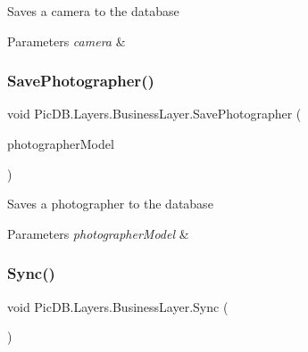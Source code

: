 Saves a camera to the database 


\begin{DoxyParams}{Parameters}
{\em camera} & \\
\hline
\end{DoxyParams}
\mbox{\label{class_pic_d_b_1_1_layers_1_1_business_layer_a7e60f5c2e5cd6f328a29d463fe55c39f}} 
\subsubsection{\texorpdfstring{Save\+Photographer()}{SavePhotographer()}}
{\footnotesize\ttfamily void Pic\+D\+B.\+Layers.\+Business\+Layer.\+Save\+Photographer (\begin{DoxyParamCaption}\item[{\mbox{\hyperlink{class_pic_d_b_1_1_models_1_1_photographer_model}{Photographer\+Model}}}]{photographer\+Model }\end{DoxyParamCaption})}



Saves a photographer to the database 


\begin{DoxyParams}{Parameters}
{\em photographer\+Model} & \\
\hline
\end{DoxyParams}
\mbox{\label{class_pic_d_b_1_1_layers_1_1_business_layer_aa09761d9c24caa93ad3e7f94ccf6379c}} 
\subsubsection{\texorpdfstring{Sync()}{Sync()}}
{\footnotesize\ttfamily void Pic\+D\+B.\+Layers.\+Business\+Layer.\+Sync (\begin{DoxyParamCaption}{ }\end{DoxyParamCaption})}



